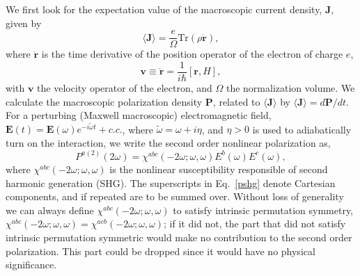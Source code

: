 \documentclass[floatfix,prb,aps,superscriptaddress,11pt]{revtex4}
\begin{document}
We first look for the expectation value of the macroscopic current density, 
$\mathbf{J}$, given by 
\begin{equation}
\langle{\mathbf{J}}\rangle=\frac{e}{\Omega}\mbox{Tr}({\rho}\dot{\mathbf{r}})
,
\label{pe}
\end{equation}
where $\dot{\mathbf{r}}$ is the time derivative of the position operator of the
electron of charge $e$, 
\begin{equation}
\mathbf{v}\equiv \dot{\mathbf{r}}=\frac{1}{i\hbar }[\mathbf{r},H],  
\label{mv}
\end{equation}
with $\mathbf{v}$ the velocity operator of the electron, and $\Omega$ the
normalization volume. We calculate the macroscopic polarization density 
$\mathbf{P}$, related to $\langle{\mathbf{J}}\rangle$ by $\langle{\mathbf{J}}\rangle=d\mathbf{P}/dt$. For a
perturbing (Maxwell macroscopic) electromagnetic field, $\mathbf{E}(t)=
\mathbf{E}(\omega )e^{-i\tilde{\omega} t}+c.c.$,
where $\tilde\omega=\omega+i\eta $,
and $\eta >0$ is used to adiabatically turn on the interaction,
we write the second order nonlinear
polarization as, 
\begin{equation}
P^{a(2)}(2\omega)=\chi ^{abc}(-2\omega;\omega,\omega)E^{b}(\omega)E^{c}(\omega),  
\label{pshg}
\end{equation}
where $\chi^{abc}(-2\omega ;\omega ,\omega )$ is the nonlinear
susceptibility responsible of second harmonic generation (SHG). The 
superscripts in Eq.~\eqref{pshg} denote Cartesian components, and if
repeated are to be summed over. Without loss of generality we can always
define $\chi^{abc}(-2\omega;\omega,\omega)$ to satisfy intrinsic permutation
symmetry, 
$\chi^{abc}(-2\omega ;\omega ,\omega )=\chi ^{acb}(-2\omega ;\omega ,\omega )$;
if it did not, the part that did not satisfy intrinsic permutation symmetric
would make no contribution to the second order polarization. This part
could be dropped since it would
have no physical significance.
\end{document}
